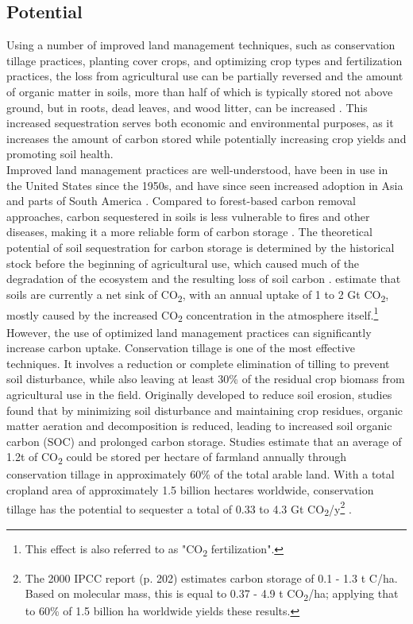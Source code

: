\subsection*{Potential}
Using a number of improved land management techniques, such as conservation tillage practices, planting cover crops, and optimizing crop types and fertilization practices, the loss from agricultural use can be partially reversed and the amount of organic matter in soils, more than half of which is typically stored not above ground, but in roots, dead leaves, and wood litter, can be increased \parencite[192]{Watson2000LandForestry, Ontl2012SoilStorage}. This increased sequestration serves both economic and environmental purposes, as it increases the amount of carbon stored while potentially increasing crop yields and promoting soil health. \parencite{Dipple2021TheSystems}\\
Improved land management practices are well-understood, have been in use in the United States since the 1950s, and have since seen increased adoption in Asia and parts of South America \parencite[202]{Watson2000LandForestry}. Compared to forest-based carbon removal approaches, carbon sequestered in soils is less vulnerable to fires and other diseases, making it a more reliable form of carbon storage \parencite{Dipple2021TheSystems}. The theoretical potential of soil sequestration for carbon storage is determined by the historical stock before the beginning of agricultural use, which caused much of the degradation of the ecosystem and the resulting loss of soil carbon \parencite{NAS2018NegativeAgenda}.
\textcite{Dipple2021TheSystems} estimate that soils are currently a net sink of CO\textsubscript{2}, with an annual uptake of 1 to 2 Gt CO\textsubscript{2}, mostly caused by the increased CO\textsubscript{2} concentration in the atmosphere itself.\footnote{This effect is also referred to as "CO\textsubscript{2} fertilization".}
However, the use of optimized land management practices can significantly increase carbon uptake. Conservation tillage is one of the most effective techniques. It involves a reduction or complete elimination of tilling to prevent soil disturbance, while also leaving at least 30\% of the residual crop biomass from agricultural use in the field. Originally developed to reduce soil erosion, studies found that by minimizing soil disturbance and maintaining crop residues, organic matter aeration and decomposition is reduced, leading to increased soil organic carbon (SOC) and prolonged carbon storage. Studies estimate that an average of 1.2t of CO\textsubscript{2} could be stored per hectare of farmland annually through conservation tillage in approximately 60\% of the total arable land. With a total cropland area of approximately 1.5 billion hectares worldwide, conservation tillage has the potential to sequester a total of 0.33 to 4.3 Gt CO\textsubscript{2}/y\footnote{The 2000 IPCC report (p. 202) estimates carbon storage of 0.1 - 1.3 t C/ha. Based on molecular mass, this is equal to 0.37 - 4.9 t CO\textsubscript{2}/ha; applying that to 60\% of 1.5 billion ha worldwide yields these results.} \parencite{Watson2000LandForestry, NRC2015ClimateSequestration}.
